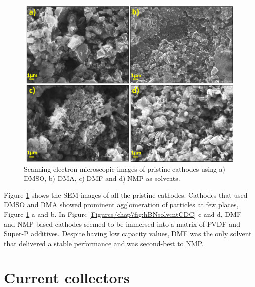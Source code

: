 \begin{figure}[h!]
\centering
\includegraphics[width=\textwidth]{Figures/chap7fig/hBNsolventSEM}
\caption{Scanning electron microscopic images of pristine cathodes using a) DMSO, b) DMA, c) DMF and d) NMP as solvents.}
\label{Figures/chap7fig:hBNsolventSEM}
\end{figure}

Figure \ref{Figures/chap7fig:hBNsolventSEM} shows the SEM images of all the pristine cathodes. Cathodes that used DMSO and DMA showed prominent agglomeration of particles at few places, Figure \ref{Figures/chap7fig:hBNsolventSEM} a and b. In Figure \ref{Figures/chap7fig:hBNsolventCDC} c and d, DMF and NMP-based cathodes seemed to be immersed into a matrix of PVDF and Super-P additives. Despite having low capacity values, DMF was the only solvent that delivered a stable performance and was second-best to NMP. \\

\section{Current collectors}

